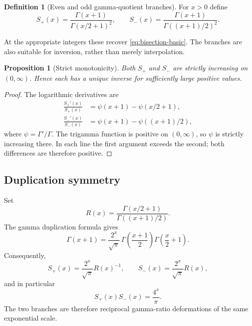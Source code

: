 \documentclass[11pt]{article}
\newtheorem{proposition}[theorem]{Proposition}
\theoremstyle{definition}
\newtheorem{definition}[theorem]{Definition}
\theoremstyle{remark}
\begin{document}
\begin{definition}[Even and odd gamma-quotient branches]\label{def:branches}
For $x>0$ define
\begin{equation}\label{eq:Sbranches}
 S_+(x)=\frac{\Gamma(x+1)}{\Gamma(x/2+1)^2},
 \qquad
 S_-(x)=\frac{\Gamma(x+1)}{\Gamma((x+1)/2)^2}.
\end{equation}
\end{definition}

At the appropriate integers these recover \eqref{eq:bisection-basic}.  The branches are also suitable for inversion, rather than merely interpolation.

\begin{proposition}[Strict monotonicity]\label{prop:monotone}
Both $S_+$ and $S_-$ are strictly increasing on $(0,\infty)$.  Hence each has a unique inverse for sufficiently large positive values.
\end{proposition}

\begin{proof}
The logarithmic derivatives are
\begin{align*}
 \frac{S_+'(x)}{S_+(x)}&=\psi(x+1)-\psi(x/2+1),\\
 \frac{S_-'(x)}{S_-(x)}&=\psi(x+1)-\psi((x+1)/2),
\end{align*}
where $\psi=\Gamma'/\Gamma$.  The trigamma function is positive on $(0,\infty)$, so $\psi$ is strictly increasing there.  In each line the first argument exceeds the second; both differences are therefore positive.
\end{proof}

\subsection{Duplication symmetry}

Set
\begin{equation}\label{eq:Rratio}
 R(x)=\frac{\Gamma(x/2+1)}{\Gamma((x+1)/2)}.
\end{equation}
The gamma duplication formula gives
\begin{equation}\label{eq:dup-gamma}
 \Gamma(x+1)=\frac{2^x}{\sqrt\pi}\,
 \Gamma\!\left(\frac{x+1}{2}\right)
 \Gamma\!\left(\frac{x}{2}+1\right).
\end{equation}
Consequently,
\begin{equation}\label{eq:Sexact-R}
 S_+(x)=\frac{2^x}{\sqrt\pi}R(x)^{-1},
 \qquad
 S_-(x)=\frac{2^x}{\sqrt\pi}R(x),
\end{equation}
and in particular
\begin{equation}\label{eq:product-duality}
 S_+(x)S_-(x)=\frac{4^x}{\pi}.
\end{equation}
The two branches are therefore reciprocal gamma-ratio deformations of the same exponential scale.
\end{document}
